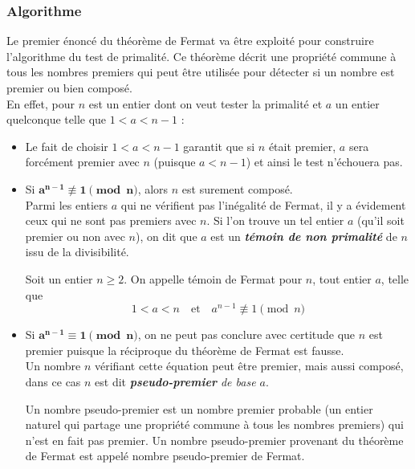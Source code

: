 	\subsubsection{Algorithme}
		Le premier énoncé du théorème de Fermat va être exploité pour construire l'algorithme du test de primalité. Ce théorème décrit une propriété commune à tous les nombres premiers qui peut être utilisée pour détecter si un nombre est premier ou bien composé.\\
		En effet, pour $n$ est un entier dont on veut tester la primalité et $a$ un entier quelconque telle que $1 < a < n - 1$ : 
		\begin{itemize}
			\item Le fait de choisir $1 < a < n - 1$ garantit que si $n$ était premier, $a$ sera forcément premier avec $n$ (puisque $a < n - 1$) et ainsi le test n'échouera pas. 
			\item Si $\mathbf{a^{n-1} \not\equiv 1 \pmod n}$, alors $n$ est surement composé.\\
			Parmi les entiers $a$ qui ne vérifient pas l'inégalité de Fermat, il y a évidement ceux qui ne sont pas premiers avec $n$. Si l'on trouve un tel entier $a$ (qu'il soit premier ou non avec $n$), on dit que $a$ est un \textit{\textbf{témoin de non primalité}} de $n$ issu de la divisibilité.
					
					\vspace{-1.5em}\begin{adjustwidth}{1.5cm}{1.5cm} 
					\begin{Def}
						\label{TemFermat}
						Soit un entier $n \geqslant 2$. On appelle témoin de Fermat pour $n$, tout entier $a$, telle que
						\[1 < a < n  \quad \text{et} \quad a^{n-1} \not\equiv 1 \pmod n\]
					\end{Def}
					\end{adjustwidth}\vspace{0.5em}
					
			\item Si $\mathbf{a^{n-1}\equiv 1 \pmod n}$, on ne peut pas conclure avec certitude que $n$ est premier puisque la réciproque du théorème de Fermat est fausse.\\
				Un nombre $n$ vérifiant cette équation peut être premier, mais aussi composé, dans ce cas $n$ est dit \textit{\textbf{pseudo-premier} de base $a$}.
					
					\vspace{-1.5em}\begin{adjustwidth}{1.5cm}{1.5cm} 
					\begin{Def}
						\label{PseudoPrem}
						Un nombre pseudo-premier est un nombre premier probable (un entier naturel qui partage une propriété commune à tous les nombres premiers) qui n'est en fait pas premier. Un nombre pseudo-premier provenant du théorème de Fermat est appelé nombre pseudo-premier de Fermat.
					\end{Def}
					\end{adjustwidth}\vspace{0.5em}
					

\end{itemize}
